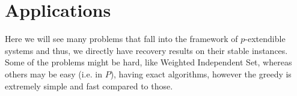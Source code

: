 \section{Applications}\label{sec:applications}

Here we will see many problems \cite{peng2016approximate} that fall into the framework of $p$-extendible systems and thus, we directly have recovery results on their stable instances. Some of the problems might be hard, like Weighted Independent Set, whereas others may be easy (i.e. in $P$), having exact algorithms, however the greedy is extremely simple and fast compared to those. 

